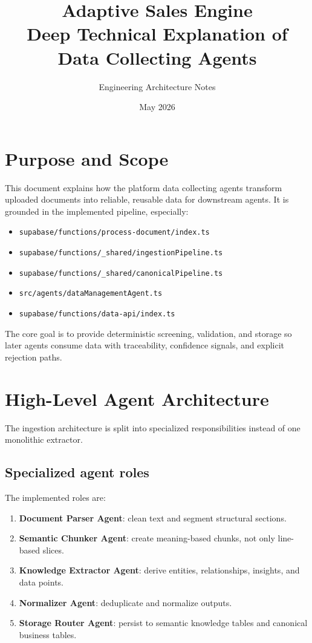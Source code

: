 \documentclass[11pt,a4paper]{article}
\title{Adaptive Sales Engine\\Deep Technical Explanation of Data Collecting Agents}
\author{Engineering Architecture Notes}
\date{May 2026}
\begin{document}
\maketitle
\tableofcontents
\newpage

\section{Purpose and Scope}
This document explains how the platform data collecting agents transform uploaded documents into reliable, reusable data for downstream agents. It is grounded in the implemented pipeline, especially:
\begin{itemize}[leftmargin=*]
  \item \texttt{supabase/functions/process-document/index.ts}
  \item \texttt{supabase/functions/\_shared/ingestionPipeline.ts}
  \item \texttt{supabase/functions/\_shared/canonicalPipeline.ts}
  \item \texttt{src/agents/dataManagementAgent.ts}
  \item \texttt{supabase/functions/data-api/index.ts}
\end{itemize}

The core goal is to provide deterministic screening, validation, and storage so later agents consume data with traceability, confidence signals, and explicit rejection paths.

\section{High-Level Agent Architecture}
The ingestion architecture is split into specialized responsibilities instead of one monolithic extractor.

\subsection{Specialized agent roles}
The implemented roles are:
\begin{enumerate}[leftmargin=*]
  \item \textbf{Document Parser Agent}: clean text and segment structural sections.
  \item \textbf{Semantic Chunker Agent}: create meaning-based chunks, not only line-based slices.
  \item \textbf{Knowledge Extractor Agent}: derive entities, relationships, insights, and data points.
  \item \textbf{Normalizer Agent}: deduplicate and normalize outputs.
  \item \textbf{Storage Router Agent}: persist to semantic knowledge tables and canonical business tables.
\end{enumerate}
\end{document}
